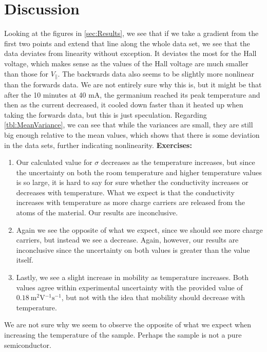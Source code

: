 \documentclass[12pt]{article}
\numberwithin{equation}{section}
\numberwithin{figure}{section}
\numberwithin{table}{section}
\begin{document}
    \section{Discussion}\label{sec:DiscussionRecommendations}
    Looking at the figures in \autoref{sec:Results}, we see that if we take a gradient from the 
    first two points and extend that line along the whole data set, we see that the data 
    deviates from linearity without exception. It deviates the most for the Hall voltage, which 
    makes sense as the values of the Hall voltage are much smaller than those for $V_\parallel$. 
    The backwards data also seems to be slightly more nonlinear than the forwards data. We are not 
    entirely sure why this is, but it might be that after the 10 minutes at 40 mA, the germanium 
    reached its peak temperature and then as the current decreased, it cooled down faster than 
    it heated up when taking the forwards data, but this is just speculation. \newline
    Regarding \autoref{tbl:MeanVariance}, we can see that while the variances are small, they are 
    still big enough relative to the mean values, which shows that there is some deviation in the 
    data sets, further indicating nonlinearity. 
    \textbf{Exercises:}
    \begin{enumerate}
        \item Our calculated value for $\sigma$ decreases as the temperature increases, but since 
        the uncertainty on both the room temperature and higher temperature values is so large, 
        it is hard to say for sure whether the conductivity increases or decreases with temperature. 
        What we expect is that the conductivity increases with temperature as more charge carriers 
        are released from the atoms of the material. Our results are inconclusive.

        \item Again we see the opposite of what we expect, since we should see more charge carriers, 
        but instead we see a decrease. Again, however, our results are inconclusive since the 
        uncertainty on both values is greater than the value itself.

        \item Lastly, we see a slight increase in mobility as temperature increases. Both values 
        agree within experimental uncertainty with the provided value of 
        $\SI{0.18}{\metre^2\volt^{-1}\second^{-1}}$, but not with the idea that mobility should 
        decrease with temperature. 
    \end{enumerate}
    We are not sure why we seem to observe the opposite of what we expect when increasing the 
    temperature of the sample. Perhaps the sample is not a pure semiconductor.
\end{document}
